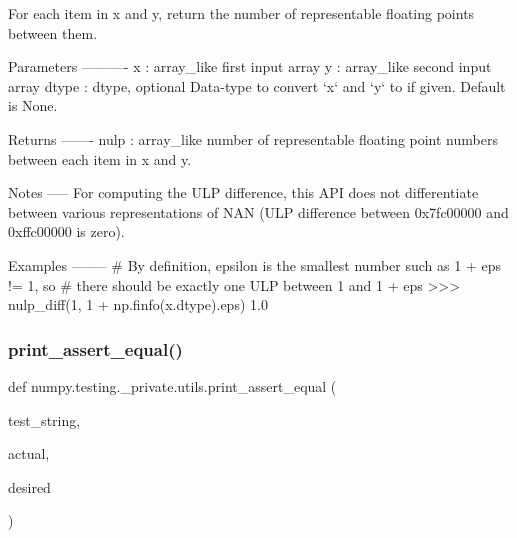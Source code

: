 \begin{DoxyVerb}For each item in x and y, return the number of representable floating
points between them.

Parameters
----------
x : array_like
    first input array
y : array_like
    second input array
dtype : dtype, optional
    Data-type to convert `x` and `y` to if given. Default is None.

Returns
-------
nulp : array_like
    number of representable floating point numbers between each item in x
    and y.

Notes
-----
For computing the ULP difference, this API does not differentiate between
various representations of NAN (ULP difference between 0x7fc00000 and 0xffc00000
is zero).

Examples
--------
# By definition, epsilon is the smallest number such as 1 + eps != 1, so
# there should be exactly one ULP between 1 and 1 + eps
>>> nulp_diff(1, 1 + np.finfo(x.dtype).eps)
1.0
\end{DoxyVerb}
 \mbox{\label{namespacenumpy_1_1testing_1_1__private_1_1utils_a67fc795c17bd64636f114222ad32d9fa}} 
\subsubsection{\texorpdfstring{print\+\_\+assert\+\_\+equal()}{print\_assert\_equal()}}
{\footnotesize\ttfamily def numpy.\+testing.\+\_\+private.\+utils.\+print\+\_\+assert\+\_\+equal (\begin{DoxyParamCaption}\item[{}]{test\+\_\+string,  }\item[{}]{actual,  }\item[{}]{desired }\end{DoxyParamCaption})}

